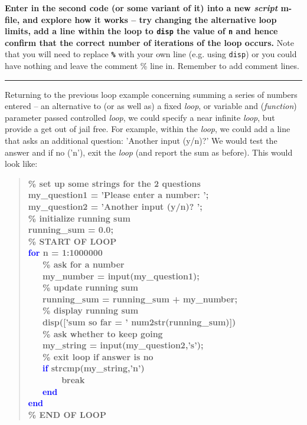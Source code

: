 \documentclass{tufte-book} %
\newenvironment{docspecbold}{\begin{quotation}\ttfamily\bfseries\parskip0pt\parindent0pt\ignorespaces}{\end{quotation}}
\begin{document}
\textbf{Enter in the second code (or some variant of it) into a new \textit{script} m-file, and explore how it works -- try changing the alternative loop limits, add a line within the loop to \texttt{disp} the value of \texttt{n} and hence confirm that the correct number of iterations of the loop occurs.} Note that you will need to replace \texttt{\textbf{\textcolor[rgb]{0,0.501961,0}{\%}}} with your own line (e.g. using \texttt{disp}) or you could have nothing and leave the comment \textcolor[rgb]{0,0.501961,0}{\%} line in. Remember to add comment lines.

\vspace{1mm}
\noindent\rule{4cm}{0.5pt}
\vspace{2mm}

\noindent Returning to the previous loop example concerning summing a series of numbers entered --  an alternative to (or as well as) a fixed \textit{loop}, or variable and (\textit{function}) parameter passed controlled \textit{loop}, we could specify a near infinite \textit{loop}, but provide a get out of jail free. For example, within the \textit{loop}, we could add a line that asks an additional question: 'Another input (y/n)?' We would test the answer and if no ('n'), exit the \textit{loop} (and report the sum as before). This would look like:
\begin{docspecbold}
\textcolor[rgb]{0,0.501961,0}{\% set up some strings for the 2 questions}
\\my\_question1 = 'Please enter a number: ';
\\my\_question2 = 'Another input (y/n)? ';
\\\textcolor[rgb]{0,0.501961,0}{\% initialize running sum}
\\running\_sum = 0.0;
\\\textcolor[rgb]{0,0.501961,0}{\% START OF LOOP}
\\\textcolor{blue}{for} n = 1:1000000
\\ \ \ \ \textcolor[rgb]{0,0.501961,0}{\% ask for a number}
\\ \ \ \ my\_number = input(my\_question1);
\\ \ \ \ \textcolor[rgb]{0,0.501961,0}{\% update running sum}
\\ \ \ \ running\_sum = running\_sum + my\_number;
\\ \ \ \ \textcolor[rgb]{0,0.501961,0}{\% display running sum}
\\ \ \ \ disp(['sum so far = ' num2str(running\_sum)])
\\ \ \ \ \textcolor[rgb]{0,0.501961,0}{\% ask whether to keep going}
\\ \ \ \ my\_string = input(my\_question2,'s');
\\ \ \ \ \textcolor[rgb]{0,0.501961,0}{\% exit loop if answer is no}
\\ \ \ \ \textcolor{blue}{if} strcmp(my\_string,'n')
\\ \ \ \ \ \ \ \ break
\\ \ \ \ \textcolor{blue}{end}
\\\textcolor{blue}{end}
\\\textcolor[rgb]{0,0.501961,0}{\% END OF LOOP}
\end{docspecbold}
\end{document}
